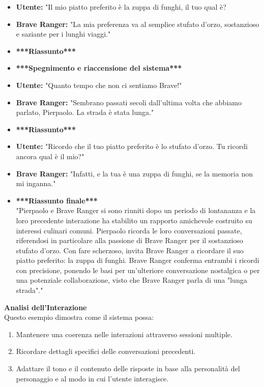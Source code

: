 \begin{itemize}
\item \textbf{Utente:} "Il mio piatto preferito è la zuppa di funghi, il tuo qual è?
\item \textbf{Brave Ranger:} "La mia preferenza va al semplice stufato d'orzo, sostanzioso e saziante per i lunghi viaggi."
\item \textbf{***Riassunto***}
\item \textbf{***Spegnimento e riaccensione del sistema***}
\item \textbf{Utente:} "Quanto tempo che non ci sentiamo Brave!"
\item \textbf{Brave Ranger:} "Sembrano passati secoli dall'ultima volta che abbiamo parlato, Pierpaolo. La strada è stata lunga."
\item \textbf{***Riassunto***}
\item \textbf{Utente:} "Ricordo che il tuo piatto preferito è lo stufato d'orzo. Tu ricordi ancora qual è il mio?"
\item \textbf{Brave Ranger:} "Infatti, e la tua è una zuppa di funghi, se la memoria non mi inganna."
\item \textbf{***Riassunto finale***}\\
"Pierpaolo e Brave Ranger si sono riuniti dopo un periodo di lontananza e la loro precedente interazione ha stabilito un rapporto amichevole costruito su interessi culinari comuni. Pierpaolo ricorda le loro conversazioni passate, riferendosi in particolare alla passione di Brave Ranger per il sostanzioso stufato d'orzo. Con fare scherzoso, invita Brave Ranger a ricordare il suo piatto preferito: la zuppa di funghi.  Brave Ranger conferma entrambi i ricordi con precisione, ponendo le basi per un'ulteriore conversazione nostalgica o per una potenziale collaborazione, visto che Brave Ranger parla di una "lunga strada"."

\end{itemize}
\textbf{Analisi dell'Interazione}\\
Questo esempio dimostra come il sistema possa:
\begin{enumerate}
\item Mantenere una coerenza nelle interazioni attraverso sessioni multiple.
\item Ricordare dettagli specifici delle conversazioni precedenti.
\item Adattare il tono e il contenuto delle risposte in base alla personalità del personaggio e al modo in cui l'utente interagisce.
\end{enumerate}

